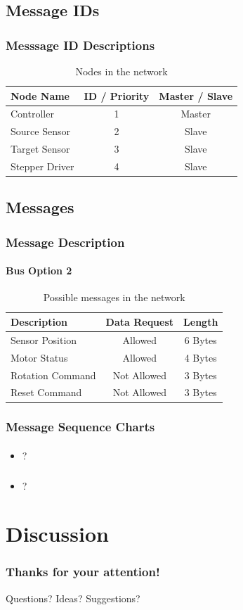 \documentclass{beamer}
\begin{document}
\subsection{Message IDs}
\begin{frame}
  \frametitle{Messsage ID Descriptions}
  \begin{table}
\begin{tabular}{l | c | c }
Node Name & ID / Priority & Master / Slave \\
\hline \hline
Controller & 1 & Master \\
Source Sensor & 2 & Slave \\
Target Sensor & 3 & Slave \\
Stepper Driver & 4 & Slave
\end{tabular}
\caption{Nodes in the network}
\end{table}
\end{frame}

\subsection{Messages}
\begin{frame}
  \frametitle{Message Description}
  \framesubtitle{Bus Option 2}
  \begin{table}
\begin{tabular}{l | c | c }
Description & Data Request & Length \\
\hline \hline
Sensor Position   & Allowed     & 6 Bytes \\
Motor Status      & Allowed     & 4 Bytes \\
Rotation Command  & Not Allowed & 3 Bytes \\
Reset Command     & Not Allowed & 3 Bytes
\end{tabular}
\caption{Possible messages in the network}
\end{table}
\end{frame}

\begin{frame}
  \frametitle{Message Sequence Charts}
  \framesubtitle{}
  \begin{itemize}
    \item ?
  \end{itemize}
\end{frame}

\begin{frame}
  \frametitle{}
  \framesubtitle{}
  \begin{itemize}
    \item ?
  \end{itemize}
\end{frame}

\section{Discussion}
\begin{frame}
  \frametitle{Thanks for your attention!}
  \huge{Questions? Ideas? Suggestions?}
\end{frame}
\end{document}

